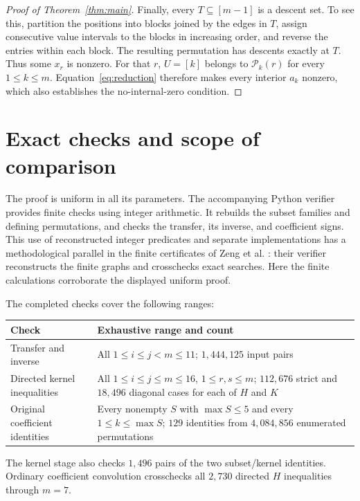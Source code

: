 \documentclass[11pt,a4paper]{article}
\theoremstyle{remark}
\begin{document}
\begin{proof}[Proof of Theorem~\ref{thm:main}]
Finally, every $T\subseteq[m-1]$ is a descent set. To see this,
partition the positions into blocks joined by the edges in $T$,
assign consecutive value intervals to the blocks in increasing order,
and reverse the entries within each block. The resulting permutation
has descents exactly at $T$. Thus some $x_r$ is nonzero. For that $r$,
$U=[k]$ belongs to $\mathcal P_k(r)$ for every $1\leq k\leq m$.
Equation~\eqref{eq:reduction} therefore makes every interior $a_k$
nonzero, which also establishes the no-internal-zero condition.
\end{proof}

\section{Exact checks and scope of comparison}

The proof is uniform in all its parameters. The accompanying Python
verifier provides finite checks using integer arithmetic. It rebuilds
the subset families and defining permutations, and checks the transfer,
its inverse, and coefficient signs. This use of reconstructed integer
predicates and separate implementations has a methodological parallel
in the finite certificates of Zeng et al.
\cite[Sections 3--4]{ZengEtAl}: their verifier reconstructs the finite
graphs and crosschecks exact searches. Here the finite calculations
corroborate the displayed uniform proof.

The completed checks cover the following ranges:
\begin{center}
\begin{tabular}{@{}p{}p{}@{}}
\toprule
Check & Exhaustive range and count\\
\midrule
Transfer and inverse & All $1\leq i\leq j<m\leq11$;
  $1{,}444{,}125$ input pairs\\[3pt]
Directed kernel inequalities & All $1\leq i\leq j\leq m\leq16$,
  $1\leq r,s\leq m$; $112{,}676$ strict and $18{,}496$ diagonal
  cases for each of $H$ and $K$\\[3pt]
Original coefficient identities & Every nonempty $S$ with
  $\max S\leq5$ and every $1\leq k\leq\max S$; $129$ identities
  from $4{,}084{,}856$ enumerated permutations\\
\bottomrule
\end{tabular}
\end{center}
The kernel stage also checks $1{,}496$ pairs of the two subset/kernel
identities. Ordinary coefficient convolution crosschecks all $2{,}730$
directed $H$ inequalities through $m=7$.
\end{document}
